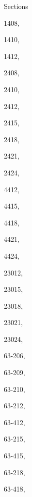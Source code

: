 \documentclass[11pt]{book}
\begin{document}
\begin{theindex}
Sections
 \item 1408, \hyperref[s1408]{\pageref{s1408}}
 \item 1410, \hyperref[s1410]{\pageref{s1410}}
 \item 1412, \hyperref[s1412]{\pageref{s1412}}
 \item 2408, \hyperref[s2408]{\pageref{s2408}}
 \item 2410, \hyperref[s2410]{\pageref{s2410}}
 \item 2412, \hyperref[s2412]{\pageref{s2412}}
 \item 2415, \hyperref[s2415]{\pageref{s2415}}
 \item 2418, \hyperref[s2418]{\pageref{s2418}}
 \item 2421, \hyperref[s2421]{\pageref{s2421}}
 \item 2424, \hyperref[s2424]{\pageref{s2424}}
 \item 4412, \hyperref[s4412]{\pageref{s4412}}
 \item 4415, \hyperref[s4415]{\pageref{s4415}}
 \item 4418, \hyperref[s4418]{\pageref{s4418}}
 \item 4421, \hyperref[s4421]{\pageref{s4421}}
 \item 4424, \hyperref[s4424]{\pageref{s4424}}
 \item 23012, \hyperref[s23012]{\pageref{s23012}}
 \item 23015, \hyperref[s23015]{\pageref{s23015}}
 \item 23018, \hyperref[s23018]{\pageref{s23018}}
 \item 23021, \hyperref[s23021]{\pageref{s23021}}
 \item 23024, \hyperref[s23024]{\pageref{s23024}}
 \item 63-206, \hyperref[s63-206]{\pageref{s63-206}}
 \item 63-209, \hyperref[s63-209]{\pageref{s63-209}}
 \item 63-210, \hyperref[s63-209]{\pageref{s63-209}}
 \item 63-212, \hyperref[s63-209]{\pageref{s63-209}}
 \item 63-412, \hyperref[s63-209]{\pageref{s63-209}}
 \item 63-215, \hyperref[s63-209]{\pageref{s63-209}}
 \item 63-415, \hyperref[s63-209]{\pageref{s63-209}}
 \item 63-218, \hyperref[s63-209]{\pageref{s63-209}}
 \item 63-418, \hyperref[s63-209]{\pageref{s63-209}}

\end{theindex}
\end{document}

